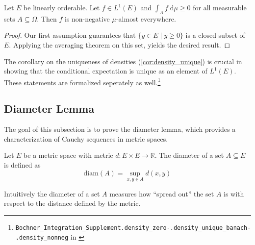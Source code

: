 \begin{corollary}
	Let $E$ be linearly orderable. Let $f \in L^1(E)$ and $\int_A f \;\textrm{d}\mu \ge 0$ for all measurable sets $A \subseteq \Omega$. Then $f$ is non-negative $\mu$-almost everywhere.
\end{corollary}
\begin{proof}
	Our first assumption guarantees that $\{ y \in E \;\vert\; y \ge 0 \}$ is a closed subset of $E$. Applying the averaging theorem on this set, yields the desired result.
\end{proof}

The corollary on the uniqueness of densities (\ref{cor:density_unique}) is crucial in showing that the conditional expectation is unique as an element of $L^1(E)$. These statements are formalized seperately as well.\footnote{\texttt{Bochner\_Integration\_Supplement.density\_zero}\quad \texttt{-.density\_unique\_banach}\quad \texttt{-.density\_nonneg} in \cite{Keskin_A_Formalization_of_2023}}

\subsection{Diameter Lemma}

The goal of this subsection is to prove the diameter lemma, which provides a characterization of Cauchy sequences in metric spaces.

\begin{definition}
Let $E$ be a metric space with metric $d : E \times E \rightarrow \mathbb{R}$. The diameter of a set $A \subseteq E$ is defined as
\[
	\textrm{diam}(A) = \sup_{x,y \in A} d(x,y)
\]
\end{definition}

Intuitively the diameter of a set $A$ measures how ``spread out'' the set $A$ is with respect to the distance defined by the metric.

